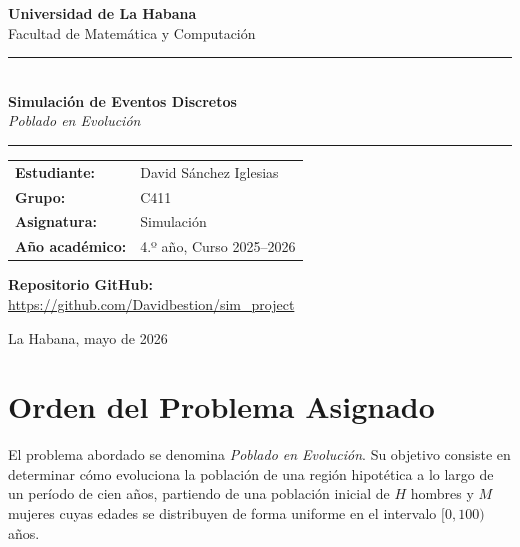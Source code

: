 \documentclass[12pt, a4paper]{article}
\begin{document}
\begin{titlepage}
  \centering
  \vspace*{1.5cm}

  {\Large \textbf{Universidad de La Habana}\\[0.3em]
   \large Facultad de Matemática y Computación}

  \vspace{2cm}
  \rule{\linewidth}{0.5pt}\\[0.4cm]
  {\LARGE \textbf{Simulación de Eventos Discretos}}\\[0.3cm]
  {\large \textit{Poblado en Evolución}}\\[0.2cm]
  \rule{\linewidth}{0.5pt}

  \vspace{1.5cm}

  \begin{tabular}{ll}
    \textbf{Estudiante:}  & {David S\'anchez Iglesias} \\[0.4em]
    \textbf{Grupo:}       & {C411} \\[0.4em]
    \textbf{Asignatura:}  & Simulación \\[0.4em]
    \textbf{Año académico:} & 4.º año, Curso 2025--2026 \\
  \end{tabular}

  \vspace{2cm}

  \textbf{Repositorio GitHub:}\\[0.3em]
  \url{https://github.com/Davidbestion/sim_project}

  \vfill
  {\small La Habana, mayo de 2026}
\end{titlepage}

\tableofcontents
\newpage

\section{Orden del Problema Asignado}

El problema abordado se denomina \textit{Poblado en Evolución}.
Su objetivo consiste en determinar cómo evoluciona la población de una región
hipotética a lo largo de un período de cien años, partiendo de una población
inicial de $H$ hombres y $M$ mujeres cuyas edades se distribuyen de forma
uniforme en el intervalo $[0, 100)$ años.
\end{document}
